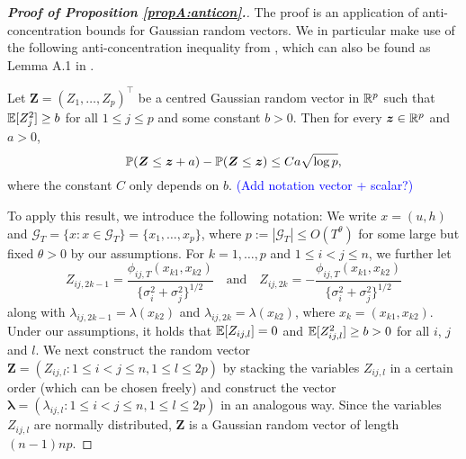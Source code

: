 \begin{proof}[\textnormal{\textbf{Proof of Proposition \ref{propA:anticon}.}}] 
The proof is an application of anti-concentration bounds for Gaussian random vectors. We in particular make use of the following anti-concentra\-tion inequality from \cite{Nazarov2003}, which can also be found as Lemma A.1 in \cite{Chernozhukov2017}. 
\begin{lemmaA}\label{lemma-Nazarov}
Let $\boldsymbol{Z} = (Z_1,\ldots,Z_p)^\top$ be a centred Gaussian random vector in $\mathbb{R}^p$ such that $\mathbb{E}[Z_j^2] \ge b$ for all $1 \le j \le p$ and some constant $b > 0$. Then for every $\boldsymbol{z} \in \mathbb{R}^p$ and $a > 0$,
\[ \mathbb{P}(\boldsymbol{Z} \le \boldsymbol{z} + a) - \mathbb{P}(\boldsymbol{Z} \le \boldsymbol{z}) \le C a \sqrt{\log p}, \]  
where the constant $C$ only depends on $b$. \textcolor{blue}{(Add notation vector + scalar?)}
\end{lemmaA}
To apply this result, we introduce the following notation: We write $x = (u,h)$ and $\mathcal{G}_T = \{ x : x \in \mathcal{G}_T \} = \{x_1,\ldots,x_p\}$, where $p := |\mathcal{G}_T| \le O(T^\theta)$ for some large but fixed $\theta > 0$ by our assumptions. For $k = 1,\ldots,p$ and $1 \le i < j \le n$, we further let 
\[ Z_{ij, 2k-1} = \frac{\phi_{ij, T}(x_{k1},x_{k2})}{\{{\sigma}_i^2 + {\sigma}_j^2\}^{1/2}} \quad \text{and} \quad Z_{ij, 2k} = -\frac{\phi_{ij, T}(x_{k1},x_{k2})}{\{{\sigma}_i^2 + {\sigma}_j^2\}^{1/2}} \]  
along with $\lambda_{ij,2k-1} = \lambda(x_{k2})$ and $\lambda_{ij,2k} = \lambda(x_{k2})$, where $x_k = (x_{k1},x_{k2})$. Under our assumptions, it holds that $\mathbb{E}[Z_{ij,l}] = 0$ and $\mathbb{E}[Z_{ij,l}^2] \ge b > 0$ for all $i$, $j$ and $l$. We next construct the random vector $\boldsymbol{Z} = ( Z_{ij,l} : 1 \le i < j \le n, 1 \le l \le 2p)$ by stacking the variables $Z_{ij, l}$ in a certain order (which can be chosen freely) and construct the vector $\boldsymbol{\lambda} = (\lambda_{ij,l}: 1 \le i < j \le n, 1 \le l \le 2p)$ in an analogous way. Since the variables $Z_{ij,l}$ are normally distributed, $\boldsymbol{Z}$ is a Gaussian random vector of length $(n-1)np$. 



\end{proof}
